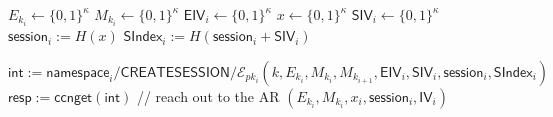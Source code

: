 \begin{algorithm*}[ht!]
\begin{algorithmic}[1]
\medskip




  \State $E_{k_i} \gets \{0,1\}^{\kappa}$ %
  \State $M_{k_i} \gets \{0,1\}^{\kappa}$ %
  \State $\mathsf{EIV}_i \gets \{0,1\}^{\kappa}$ %
  \State $x \gets \{0,1\}^{\kappa}$
  \State $\mathsf{SIV}_i \gets \{0,1\}^{\kappa}$ %
  \State $\mathsf{session}_i := H(x)$ %
  \State $\mathsf{SIndex}_i := H(\mathsf{session}_i + \mathsf{SIV}_i)$

  \State $\mathsf{int} := \mathsf{namespace}_i/\mathsf{CREATESESSION}/\mathcal{E}_{pk_i}(k, E_{k_i}, M_{k_i}, M_{k_{i+1}}, \mathsf{EIV}_i, \mathsf{SIV}_i, \mathsf{session}_i, \mathsf{SIndex}_i)$
  \State $\mathsf{resp} := \mathsf{ccnget}(\mathsf{int})$ // reach out to the AR
  \State \Return $(E_{k_i}, M_{k_i}, x_i, \mathsf{session}_i, \mathsf{IV}_i)$
\EndFunction



\end{algorithmic}
\end{algorithm*}
